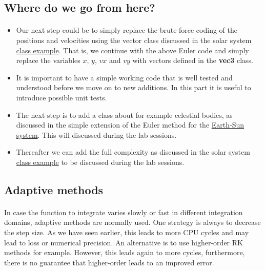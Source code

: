 \documentclass[%
oneside,                 %
final,                   %
10pt]{article}
\begin{document}
\ecppcod


\subsection{Where do we go from here?}

\paragraph{}

\begin{itemize}
\item Our next step could be to simply replace the brute force coding of the positions and velocities using the vector class discussed in the solar system  \href{{https://github.com/mortele/solar-system-fys3150}}{class example}. That is, we continue with the above Euler code and simply replace the variables $x$, $y$, $vx$ and $vy$ with vectors defined in the \textbf{vec3} class.

\item It is important to have a simple working code that is well tested and understood before we move on to new additions. In this part it is useful to introduce possible unit tests. 

\item The next step is to add a class about for example celestial bodies, as discussed in the simple extension of the Euler method for the \href{{https://github.com/andeplane/solar-system}}{Earth-Sun system}. This will discussed during the lab sessions.

\item Thereafter we can add the full complexity as discussed in the solar system \href{{https://github.com/mortele/solar-system-fys3150}}{class example} to be discussed during the lab sessions. 
\end{itemize}

\noindent



\subsection{Adaptive methods}

\paragraph{}
In case the function to integrate varies slowly or fast in different integration domains, adaptive methods are normally used. One strategy is always to decrease the step size. As we have seen earlier, this leads to more CPU cycles and may lead to loss or numerical precision. An alternative is to use higher-order RK methods for example. However, this leads again to more cycles, furthermore, there is no guarantee that higher-order leads to an improved error.
\end{document}
